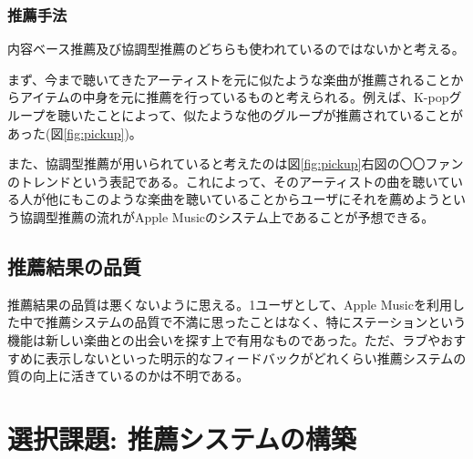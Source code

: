 \documentclass{jsarticle}
\begin{document}
\subsubsection{推薦手法}
内容ベース推薦及び協調型推薦のどちらも使われているのではないかと考える。
\par まず、今まで聴いてきたアーティストを元に似たような楽曲が推薦されることからアイテムの中身を元に推薦を行っているものと考えられる。例えば、K-popグループを聴いたことによって、似たような他のグループが推薦されていることがあった(図\ref{fig:pickup})。
\par また、協調型推薦が用いられていると考えたのは図\ref{fig:pickup}右図の〇〇ファンのトレンドという表記である。これによって、そのアーティストの曲を聴いている人が他にもこのような楽曲を聴いていることからユーザにそれを薦めようという協調型推薦の流れがApple Musicのシステム上であることが予想できる。
\subsection{推薦結果の品質}
推薦結果の品質は悪くないように思える。1ユーザとして、Apple Musicを利用した中で推薦システムの品質で不満に思ったことはなく、特にステーションという機能は新しい楽曲との出会いを探す上で有用なものであった。ただ、ラブやおすすめに表示しないといった明示的なフィードバックがどれくらい推薦システムの質の向上に活きているのかは不明である。
\section{選択課題: 推薦システムの構築}
\end{document}
